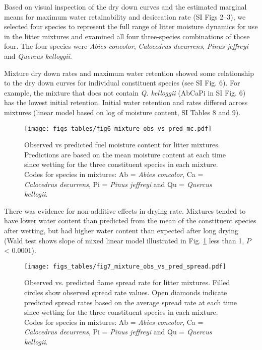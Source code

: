 \documentclass[letterpaper,12pt]{article}
\begin{document}
Based on visual inspection of the dry down curves and the estimated marginal
means for maximum water retainability and desiccation rate (SI Figs 2--3), we
selected four species to represent the full range of litter moisture dynamics
for use in the litter mixtures and examined all four three-species combinations
of those four. The four species were \emph{Abies concolor}, \emph{Calocedrus
  decurrens}, \emph{Pinus jeffreyi} and \emph{Quercus kelloggii}.

Mixture dry down rates and maximum water retention showed some relationship to
the dry down curves for individual constituent species (see SI Fig. 6). For
example, the mixture that does not contain \emph{Q. kelloggii} (AbCaPi in SI
Fig. 6) has the lowest initial retention. Initial water retention and rates
differed across mixtures (linear model based on log of moisture content, SI Tables 8 and 9).


\begin{figure}[h]
  \centering
\texttt{[image: figs\_tables/fig6\_mixture\_obs\_vs\_pred\_mc.pdf]}
\caption{Observed vs predicted fuel moisture content for litter mixtures.
  Predictions are based on the mean moisture content at each time since wetting
  for the three constituent species in each mixture. Codes for species in
  mixtures: Ab = \emph{Abies concolor}, Ca = \emph{Calocedrus decurrens}, Pi =
  \emph{Pinus jeffreyi} and Qu = \emph{Quercus kellogii}.}
  \label{fig:mixture_obs_pred_mc}
\end{figure}


There was evidence for non-additive effects in drying rate. Mixtures tended to
have lower water content than predicted from the mean of the constituent
species after wetting, but had higher water content than expected after long
drying (Wald test shows slope of mixed linear model illustrated in Fig.
\ref{fig:mixture_obs_pred_mc} less than 1, $P$ < 0.0001).


\begin{figure}[h]
  \centering
\texttt{[image: figs\_tables/fig7\_mixture\_obs\_vs\_pred\_spread.pdf]}
\caption{Observed vs. predicted flame spread rate for litter mixtures. Filled
  circles show observed spread rate values. Open diamonds indicate predicted
  spread rates based on the average spread rate at each time since wetting for
  the three constituent species in each mixture. Codes for species in mixtures:
  Ab = \emph{Abies concolor}, Ca = \emph{Calocedrus decurrens}, Pi =
  \emph{Pinus jeffreyi} and Qu = \emph{Quercus kellogii}.}
  \label{fig:mixture_obs_pred_spread}
\end{figure}
\end{document}
